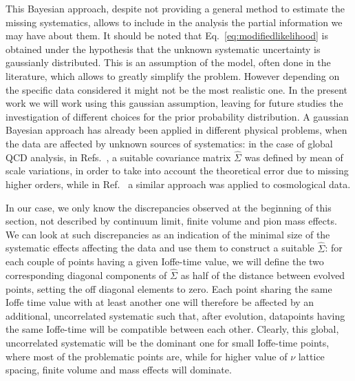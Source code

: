 This Bayesian approach, despite not providing a general method 
to estimate the missing systematics, allows to include in the analysis the partial information we may have about them.
It should be noted that Eq.~\eqref{eq:modifiedlikelihood} is obtained under the hypothesis that 
the unknown systematic uncertainty is gaussianly distributed. This is an assumption of the model, often done in the literature,
which allows to greatly simplify the problem. However depending on the specific data considered it might not be the most 
realistic one. In the present work we will work using this gaussian assumption, leaving for future studies
the investigation of different choices for the prior probability distribution. 
A gaussian Bayesian approach has already been applied in different physical problems, when the data are affected 
by unknown sources of systematics:
in the case of global QCD analysis, in Refs.~\cite{AbdulKhalek:2019bux,AbdulKhalek:2019ihb},
a suitable covariance matrix $\hat{\Sigma}$ was defined by mean of scale variations, in order to take into account 
the theoretical error due to missing higher orders, while in Ref.~\cite{Bernal:2018cxc} a similar approach was applied 
to cosmological data.

%
In our case, we only know the discrepancies observed at the beginning of this section,
not described by continuum limit, finite volume and pion mass effects.
We can look at such discrepancies as an indication of the minimal size of the systematic
effects affecting the data and use them to construct a suitable $\hat{\Sigma}$:
for each couple of points having a given Ioffe-time value, we will define the two corresponding diagonal components
of $\hat{\Sigma}$ as half of the distance between evolved points, setting the off diagonal elements to zero.
Each point sharing the same Ioffe time value with at least another one will therefore be affected by an additional, 
uncorrelated systematic such that, after evolution, datapoints having the same Ioffe-time will be compatible between each other. 
Clearly, this global, uncorrelated systematic will be the dominant one for small Ioffe-time points, 
where most of the problematic points are, while for higher value of $\nu$ lattice spacing, finite volume
and mass effects will dominate.



